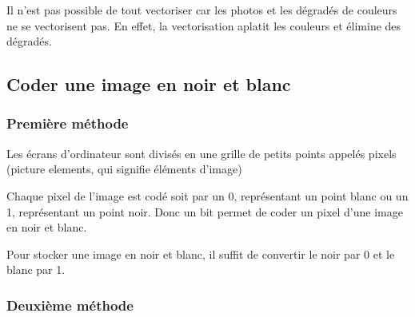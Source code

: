 \documentclass[11pt, a4paper]{book}
\begin{document}
\begin{remarque}

Il n’est pas possible de tout vectoriser car les photos et les dégradés de couleurs ne se vectorisent pas. En effet, la vectorisation aplatit les couleurs et élimine des dégradés.

\end{remarque}

\subsection{Coder une image en noir et blanc}

\subsubsection{Première méthode}

\begin{defi}
Les écrans d’ordinateur sont divisés en une grille de petits points appelés pixels (picture elements, qui signifie éléments d’image)
\end{defi}

Chaque pixel de l'image est codé soit par un 0, représentant un point blanc ou un 1, représentant un point noir. Donc un bit permet de coder un pixel d’une image en noir et blanc. 

Pour stocker une image en noir et blanc, il suffit de convertir le noir par 0 et le blanc par 1. 

\begin{center}
\end{center}

\subsubsection{Deuxième méthode}
\end{document}
